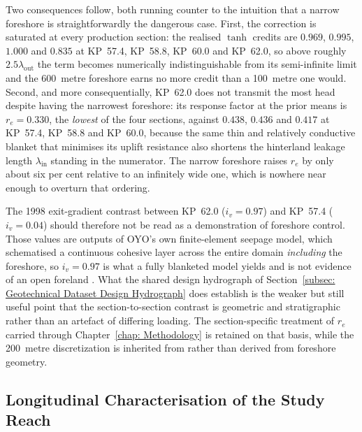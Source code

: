 Two consequences follow, both running counter to the intuition that a narrow foreshore is straightforwardly the dangerous case. First, the correction is saturated at every production section: the realised $\tanh$ credits are $0.969$, $0.995$, $1.000$ and $0.835$ at KP~57.4, KP~58.8, KP~60.0 and KP~62.0, so above roughly $2.5\lambda_\mathrm{out}$ the term becomes numerically indistinguishable from its semi-infinite limit and the 600~metre foreshore earns no more credit than a 100~metre one would. Second, and more consequentially, KP~62.0 does not transmit the most head despite having the narrowest foreshore: its response factor at the prior means is $r_e = 0.330$, the \emph{lowest} of the four sections, against $0.438$, $0.436$ and $0.417$ at KP~57.4, KP~58.8 and KP~60.0, because the same thin and relatively conductive blanket that minimises its uplift resistance also shortens the hinterland leakage length $\lambda_\mathrm{in}$ standing in the numerator. The narrow foreshore raises $r_e$ by only about six per cent relative to an infinitely wide one, which is nowhere near enough to overturn that ordering.

The 1998 exit-gradient contrast between KP~62.0 ($i_v = 0.97$) and KP~57.4 ($i_v = 0.04$) should therefore not be read as a demonstration of foreshore control. Those values are outputs of OYO's own finite-element seepage model, which schematised a continuous cohesive layer across the entire domain \emph{including} the foreshore, so $i_v = 0.97$ is what a fully blanketed model yields and is not evidence of an open foreland \parencite{oyo_1999}. What the shared design hydrograph of Section~\ref{subsec: Geotechnical Dataset Design Hydrograph} does establish is the weaker but still useful point that the section-to-section contrast is geometric and stratigraphic rather than an artefact of differing loading. The section-specific treatment of $r_e$ carried through Chapter~\ref{chap: Methodology} \parencite{pol_thesis_2022, pol_sie_2024} is retained on that basis, while the 200~metre discretization is inherited from \textcite{uemura_phd_2025} rather than derived from foreshore geometry.

\subsection{Longitudinal Characterisation of the Study Reach}
\label{subsec: Longitudinal Characterisation of the Study Reach}

